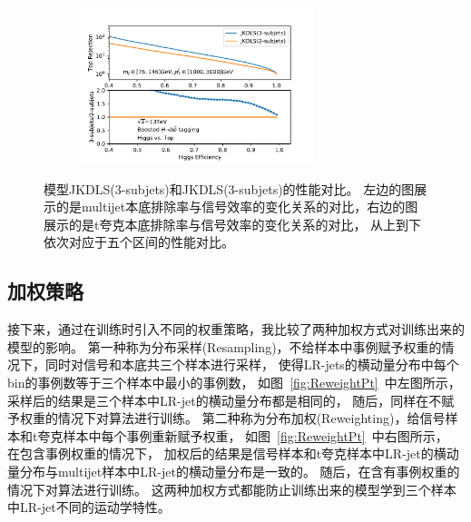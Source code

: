 \begin{figure}[htbp]
\begin{subfigure}{.5\textwidth}
     \caption{}
   \label{fig:}
  \end{subfigure}
  \begin{subfigure}{.5\textwidth}
  \centering
   \includegraphics[width=0.75\textwidth]{figuresXbb/Subjet/SUBTopMASSPT3.pdf}
     \caption{}
   \label{fig:}
  \end{subfigure}
  \caption{
 模型JKDLS(3-subjets)和JKDLS(3-subjets)的性能对比。
左边的图展示的是multijet本底排除率与信号效率的变化关系的对比，右边的图展示的是t夸克本底排除率与信号效率的变化关系的对比，
从上到下依次对应于五个区间的性能对比。
  }
  \label{fig:SubjetROC}
\end{figure} 


\subsection{加权策略}
\label{sec:XbbTagger3}

接下来，通过在训练时引入不同的权重策略，我比较了两种加权方式对训练出来的模型的影响。
第一种称为分布采样(Resampling)，不给样本中事例赋予权重的情况下，同时对信号和本底共三个样本进行采样，
使得LR-jets的横动量分布中每个bin的事例数等于三个样本中最小的事例数，
如图~\ref{fig:ReweightPt}~中左图所示，采样后的结果是三个样本中LR-jet的横动量分布都是相同的，
随后，同样在不赋予权重的情况下对算法进行训练。
第二种称为分布加权(Reweighting)，给信号样本和t夸克样本中每个事例重新赋予权重，
如图~\ref{fig:ReweightPt}~中右图所示，
在包含事例权重的情况下，
加权后的结果是信号样本和t夸克样本中LR-jet的横动量分布与multijet样本中LR-jet的横动量分布是一致的。
随后，在含有事例权重的情况下对算法进行训练。
这两种加权方式都能防止训练出来的模型学到三个样本中LR-jet不同的运动学特性。

